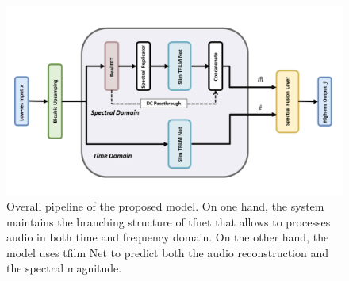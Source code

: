 \begin{figure}[!htb]
	\begin{center}
		\includegraphics[scale=0.48]{img/proposed_pipeline.png}
		\captionsetup{margin=2cm}
		\caption{Overall pipeline of the proposed model. On one hand, the system maintains the branching structure of \gls{tfnet} that allows to processes audio in both time and frequency domain. On the other hand, the model uses \gls{tfilm} Net to predict both the audio reconstruction and the spectral magnitude.} 
		\label{fig:proposed_pipeline}
	\end{center}
\end{figure}


